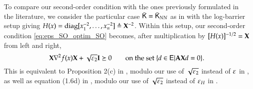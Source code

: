 \begin{remark}\label{rem:soopt}
To compare our second-order condition with the ones previously formulated in the literature, we consider the particular case $\bar{\mathsf{K}}=\bar{\mathsf{K}}_{NN}$ as in \cite{HaeLiuYe18,NeiWr20} with the log-barrier setup giving $H(x)=\operatorname{diag}[x_{1}^{-2},\ldots,x_{n}^{-2}]\triangleq\mathbf{X}^{-2}$. Within this setup, our second-order condition \eqref{eq:eps_SO_optim_SO} becomes, after multiplication by  $[H(x)]^{-1/2}=\mathbf{X}$ from left and right,
\[
\XX\nabla^{2}f(x)\XX+\sqrt{\eps_{2}}\bI\succeq 0\qquad \text{on the set }\{d\in\setE\vert \bA\XX d=0\}.%
\] 
This is equivalent to Proposition 2(c) in \cite{HaeLiuYe18}, modulo our use of $\sqrt{\varepsilon_{2}}$ instead of $\varepsilon$ in \cite{HaeLiuYe18}, as well as equation (1.6d) in \cite{NeiWr20}, modulo our use of $\sqrt{\varepsilon_{2}}$ instead of $\varepsilon_H$ in \cite{NeiWr20}.
%
%
%
\close
\end{remark}
